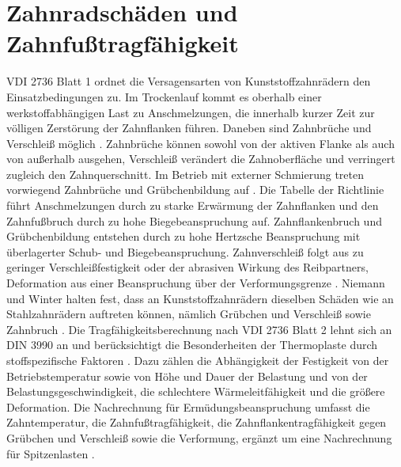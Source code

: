 \section{Zahnradschäden und Zahnfußtragfähigkeit}
\label{sec:schaeden}

VDI 2736 Blatt 1 ordnet die Versagensarten von Kunststoffzahnrädern den Einsatzbedingungen zu. Im Trockenlauf kommt es oberhalb einer werkstoffabhängigen Last zu Anschmelzungen, die innerhalb kurzer Zeit zur völligen Zerstörung der Zahnflanken führen. Daneben sind Zahnbrüche und Verschleiß möglich \cite[S.~14]{VDI2736-1}. Zahnbrüche können sowohl von der aktiven Flanke als auch von außerhalb ausgehen, Verschleiß verändert die Zahnoberfläche und verringert zugleich den Zahnquerschnitt. Im Betrieb mit externer Schmierung treten vorwiegend Zahnbrüche und Grübchenbildung auf \cite[S.~15]{VDI2736-1}. Die Tabelle der Richtlinie führt Anschmelzungen durch zu starke Erwärmung der Zahnflanken und den Zahnfußbruch durch zu hohe Biegebeanspruchung auf. Zahnflankenbruch und Grübchenbildung entstehen durch zu hohe Hertzsche Beanspruchung mit überlagerter Schub- und Biegebeanspruchung. Zahnverschleiß folgt aus zu geringer Verschleißfestigkeit oder der abrasiven Wirkung des Reibpartners, Deformation aus einer Beanspruchung über der Verformungsgrenze \cite[S.~16]{VDI2736-1}. Niemann und Winter halten fest, dass an Kunststoffzahnrädern dieselben Schäden wie an Stahlzahnrädern auftreten können, nämlich Grübchen und Verschleiß sowie Zahnbruch \cite[S.~350]{NieWin03}. Die Tragfähigkeitsberechnung nach VDI 2736 Blatt 2 lehnt sich an DIN 3990 an und berücksichtigt die Besonderheiten der Thermoplaste durch stoffspezifische Faktoren \cite[S.~5 f.]{VDI2736-2}. Dazu zählen die Abhängigkeit der Festigkeit von der Betriebstemperatur sowie von Höhe und Dauer der Belastung und von der Belastungsgeschwindigkeit, die schlechtere Wärmeleitfähigkeit und die größere Deformation. Die Nachrechnung für Ermüdungsbeanspruchung umfasst die Zahntemperatur, die Zahnfußtragfähigkeit, die Zahnflankentragfähigkeit gegen Grübchen und Verschleiß sowie die Verformung, ergänzt um eine Nachrechnung für Spitzenlasten \cite[S.~6]{VDI2736-2}.

